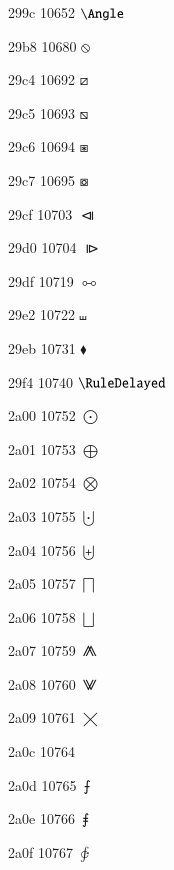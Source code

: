 \documentclass[11pt]{article}
\begin{document}


299c 10652 \ensuremath{\Angle}




29b8 10680 \ensuremath{\obslash}

29c4 10692 \ensuremath{\boxdiag}

29c5 10693 \ensuremath{\boxbslash}

29c6 10694 \ensuremath{\boxast}

29c7 10695 \ensuremath{\boxcircle}



29cf 10703 \ensuremath{\LeftTriangleBar}

29d0 10704 \ensuremath{\RightTriangleBar}


29df 10719 \ensuremath{\dualmap}

29e2 10722 \ensuremath{\shuffle}

29eb 10731 \ensuremath{\blacklozenge}

29f4 10740 \ensuremath{\RuleDelayed}

2a00 10752 \ensuremath{\bigodot}

2a01 10753 \ensuremath{\bigoplus}

2a02 10754 \ensuremath{\bigotimes}

2a03 10755 \ensuremath{\bigcupdot}

2a04 10756 \ensuremath{\biguplus}

2a05 10757 \ensuremath{\bigsqcap}

2a06 10758 \ensuremath{\bigsqcup}

2a07 10759 \ensuremath{\conjquant}

2a08 10760 \ensuremath{\disjquant}

2a09 10761 \ensuremath{\bigtimes}

2a0c 10764 \iiiint

2a0d 10765 \ensuremath{\intbar}

2a0e 10766 \ensuremath{\intBar}

2a0f 10767 \ensuremath{\clockoint}
\end{document}
